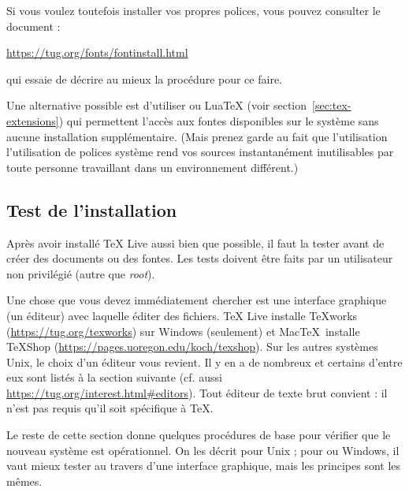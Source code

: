 \documentclass[german, english, french]{article}
\renewcommand{\TL}{\TeX{} Live\xspace}%
\newcommand\eng[1]{\foreignlanguage{english}{\emph{#1}}}
\begin{document}
Si vous voulez toutefois installer vos propres polices, vous pouvez consulter le
document :

\url{https://tug.org/fonts/fontinstall.html}

qui essaie de décrire au mieux la procédure pour ce faire.

Une alternative possible est d'utiliser \XeTeX{} ou Lua\TeX{} (voir
section~\ref{sec:tex-extensions}) qui permettent l'accès aux fontes disponibles
sur le système sans aucune installation supplémentaire. (Mais prenez garde au
fait que l'utilisation l'utilisation de polices système rend vos sources
instantanément inutilisables par toute personne travaillant dans un
environnement différent.)

\subsection{Test de l'installation}
\label{sec:test-install}

Après avoir installé \TL{} aussi bien que possible, il faut la tester avant de
créer des documents ou des fontes.  Les tests doivent être faits par un
utilisateur non privilégié (autre que \eng{root}).

Une chose que vous devez immédiatement chercher est une interface graphique (un
éditeur) avec laquelle éditer des fichiers. \TL{} installe \TeX{}works
(\url{https://tug.org/texworks}) sur Windows (seulement) et Mac\TeX\ installe
TeXShop (\url{https://pages.uoregon.edu/koch/texshop}). Sur les autres systèmes
Unix, le choix d'un éditeur vous revient. Il y en a de nombreux et certains
d'entre eux sont listés à la section suivante (cf. aussi
\url{https://tug.org/interest.html#editors}). Tout éditeur de texte brut
convient : il n'est pas requis qu'il soit spécifique à \TeX{}.

Le reste de cette section donne quelques procédures de base pour vérifier que le
nouveau système est opérationnel. On les décrit pour Unix ; pour \MacOSX{} ou
Windows, il vaut mieux tester au travers d'une interface graphique, mais les
principes sont les mêmes.
\end{document}
